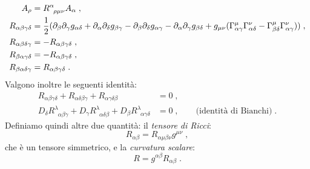 \documentclass[12pt,a4paper]{report}
\theoremstyle{definition}
\begin{document}
\begin{align}
[D_{\mu},D_{\nu}]A_{\rho}&=R^{\alpha}_{\;\;\rho\mu\nu}A_{\alpha}\;, \\
R_{\alpha\beta\gamma\delta} &=\frac{1}{2}(\partial_{\beta}\partial_{\gamma}g_{\alpha\delta}+\partial_{\alpha}\partial_{\delta}g_{\beta\gamma}-\partial_{\beta}\partial_{\delta}g_{\alpha\gamma}-\partial_{\alpha}\partial_{\gamma}g_{\beta\delta}+g_{\mu\nu}(\Gamma^{\mu}_{\alpha\gamma}\Gamma^{\nu}_{\alpha\delta}-\Gamma^{\mu}_{\beta\delta}\Gamma^{\nu}_{\alpha\gamma}))\;, \\
R_{\alpha\beta\delta\gamma} &= -R_{\alpha\beta\gamma\delta}\;, \notag \\
R_{\beta\alpha\gamma\delta} &= -R_{\alpha\beta\gamma\delta}\;, \notag \\
R_{\beta\alpha\delta\gamma} &= R_{\alpha\beta\gamma\delta}\;.
\end{align}
Valgono inoltre le seguenti identità:
\begin{align}
R_{\alpha\beta\gamma\delta}+R_{\alpha\delta\beta\gamma}+R_{\alpha\gamma\delta\beta} &=0\;, \\
D_{\delta}R^{\lambda}_{\;\;\alpha\beta\gamma}+D_{\gamma}R^{\lambda}_{\;\;\alpha\delta\beta}+D_{\beta}R^{\lambda}_{\;\;\alpha\gamma\delta} &=0\;,\qquad \mbox{(identità di Bianchi)}\;.\label{ch4_identitabianchi}
\end{align}
Definiamo quindi altre due quantità: il \emph{tensore di Ricci}:
\begin{equation}
R_{\alpha\beta}=R_{\alpha\mu\beta\nu}g^{\mu\nu}\;,
\end{equation}
che è un tensore simmetrico, e la \emph{curvatura scalare}:
\begin{equation}
R=g^{\alpha\beta}R_{\alpha\beta}\;.
\end{equation}
\end{document}

